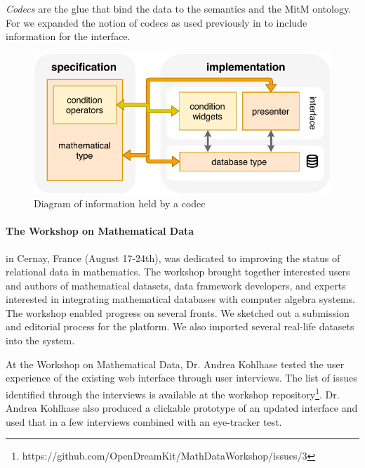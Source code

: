 \medskip

\emph{Codecs} are the glue that bind the data to the semantics and the MitM ontology.
For \dmh we expanded the notion of codecs as used previously in \pn to include information for the interface.
\begin{figure}[ht]
  \includegraphics{codec.pdf}
  \caption{Diagram of information held by a \dmh codec}\label{fig:codec}
\end{figure}

\paragraph{The Workshop on Mathematical Data}
 in Cernay, France (August 17-24th),
was dedicated to improving the status of relational data in mathematics.
The workshop brought together interested users and authors of mathematical datasets, 
data framework developers, 
and experts interested in integrating mathematical databases with computer algebra systems.
The workshop enabled progress on several fronts.
We sketched out a submission and editorial process for the platform.
We also imported several real-life datasets into the system.

At the Workshop on Mathematical Data,
Dr. Andrea Kohlhase tested the user experience of the existing web interface
through user interviews.
The list of issues identified through the interviews is available at the 
workshop repository\footnote{https://github.com/OpenDreamKit/MathDataWorkshop/issues/3}.
Dr. Andrea Kohlhase also produced a clickable prototype of an updated interface
and used that in a few interviews combined with an eye-tracker test.





